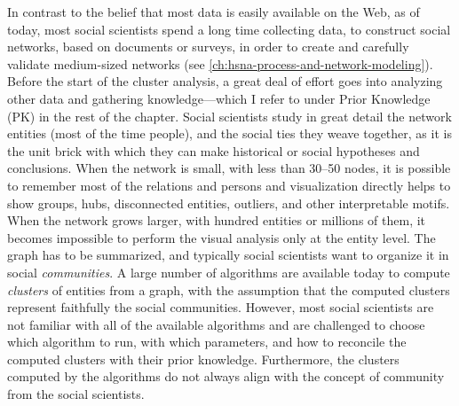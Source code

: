 In contrast to the belief that most data is easily available on the Web, as of today, most social scientists spend a long time collecting data, to construct social networks, based on documents or surveys, in order to create and carefully validate medium-sized networks (see \autoref{ch:hsna-process-and-network-modeling}).
Before the start of the cluster analysis, a great deal of effort goes into analyzing other data and gathering knowledge---which I refer to under Prior Knowledge (PK) in the rest of the chapter.
Social scientists study in great detail the network entities (most of the time people), and the social ties they weave together, as it is the unit brick with which they can make historical or social hypotheses and conclusions.
When the network is small, with less than 30--50 nodes, it is possible to remember most of the relations and persons and visualization directly helps to show groups, hubs, disconnected entities, outliers, and other interpretable motifs.
When the network grows larger, with hundred entities or millions of them, it becomes impossible to perform the visual analysis only at the entity level.
The graph has to be summarized, and typically social scientists want to organize it in social \emph{communities}.  A large number of algorithms are available today to compute \emph{clusters} of entities from a graph, with the assumption that the computed clusters represent faithfully the social communities.
However, most social scientists are not familiar with all of the available algorithms and are challenged to choose which algorithm to run, with which parameters, and how to reconcile the computed clusters with their prior knowledge. Furthermore, the clusters computed by the algorithms do not always align with the concept of community from the social scientists.


